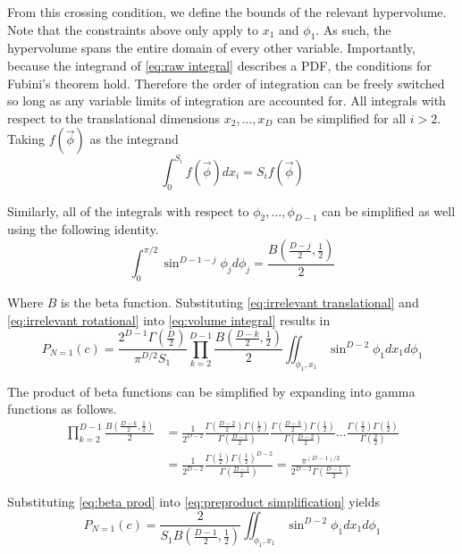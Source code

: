 \documentclass{article}
\begin{document}
From this crossing condition, we define the bounds of the relevant hypervolume. Note that the constraints above only apply to $x_1$ and
$\phi_1$. As such, the hypervolume spans the entire domain of every other variable. Importantly, because the integrand of \ref{eq:raw integral}
describes a PDF, the conditions for Fubini's theorem hold. Therefore the order of integration can be freely switched so long as any variable
limits of integration are accounted for. All integrals with respect to the translational dimensions $x_2, \hdots, x_D$ can be simplified
for all $i>2$. Taking $f(\vec\phi)$ as the integrand
\begin{equation}
	\int_0^{S_i}f(\vec\phi)dx_i = S_if(\vec\phi) \label{eq:irrelevant translational}
\end{equation}

Similarly, all of the integrals with respect to $\phi_2, \hdots, \phi_{D-1}$ can be simplified as well using the following identity.
\begin{equation}
	\int_0^{\pi/2}\sin^{D-1-j}\phi_jd\phi_j = \frac{B(\frac{D-j}{2}, \frac{1}{2})}{2}\label{eq:irrelevant rotational}
\end{equation}

Where $B$ is the beta function. Substituting \ref{eq:irrelevant translational} and \ref{eq:irrelevant rotational} into 
\ref{eq:volume integral} results in
\begin{equation} \label{eq:preproduct simplification}
	P_{N=1}(c) = \frac{2^{D-1}\Gamma(\frac{D}{2})}{\pi^{D/2}S_1} \prod_{k=2}^{D-1}\frac{B(\frac{D-k}{2}, \frac{1}{2})}{2} \iint_{\phi_1,x_1}\sin^{D-2}\phi_1 dx_1 d\phi_1
\end{equation}

The product of beta functions can be simplified by expanding into gamma functions as follows.
\begin{align}
	\prod_{k=2}^{D-1}\frac{B(\frac{D-k}{2}, \frac{1}{2})}{2} &= \frac{1}{2^{D-2}} \frac{\Gamma(\frac{D-2}{2})\Gamma(\frac{1}{2})}{\Gamma(\frac{D-1}{2})} \frac{\Gamma(\frac{D-3}{2})\Gamma(\frac{1}{2})}{\Gamma(\frac{D-2}{2})} \hdots \frac{\Gamma(\frac{1}{2})\Gamma(\frac{1}{2})}{\Gamma(\frac{2}{2})} \\
	&= \frac{1}{2^{D-2}} \frac{\Gamma(\frac{1}{2})\Gamma(\frac{1}{2})^{D-2}}{\Gamma(\frac{D-1}{2})} = \frac{\pi^{(D-1)/2}}{2^{D-2}\Gamma(\frac{D-1}{2})} \label{eq:beta prod}
\end{align}

Substituting \ref{eq:beta prod} into \ref{eq:preproduct simplification} yields
\begin{equation}
	P_{N=1}(c) = \frac{2}{S_1B(\frac{D-1}{2}, \frac{1}{2})} \iint_{\phi_1,x_1}\sin^{D-2}\phi_1 dx_1 d\phi_1 \label{eq:n=1 int}
\end{equation}
\end{document}
